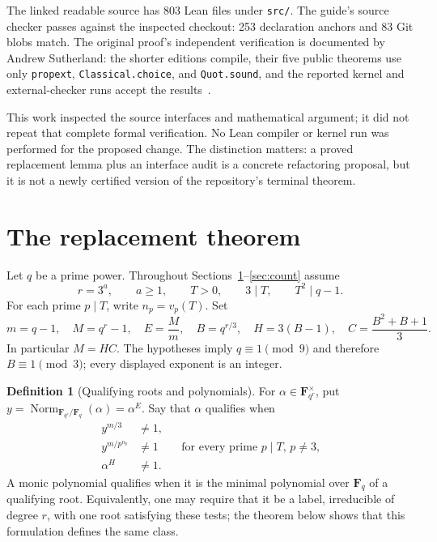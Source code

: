 \documentclass[11pt,a4paper]{article}
\newcommand{\F}{\mathbf F}
\newcommand{\Nm}{\operatorname{Norm}}
\newcommand{\src}[1]{\nolinkurl{#1}}
\theoremstyle{definition}
\newtheorem{definition}[theorem]{Definition}
\theoremstyle{remark}
\begin{document}
The linked readable source has 803 Lean files under \src{src/}. The guide's
source checker passes against the inspected checkout: 253 declaration
anchors and 83 Git blobs match. The original proof's independent
verification is documented by Andrew Sutherland: the shorter editions
compile, their five public theorems use only \src{propext},
\src{Classical.choice}, and \src{Quot.sound}, and the reported kernel and
external-checker runs accept the results~\cite{sutherland}.

This work inspected the source interfaces and mathematical argument; it
did not repeat that complete formal verification. No Lean compiler or
kernel run was performed for the proposed change. The distinction matters:
a proved replacement lemma plus an interface audit is a concrete
refactoring proposal, but it is not a newly certified version of the
repository's terminal theorem.

\section{The replacement theorem}
\label{sec:theorem}

Let $q$ be a prime power. Throughout Sections~\ref{sec:theorem}--\ref{sec:count}
assume
\begin{equation}
 r=3^a,\qquad a\ge1,\qquad T>0,\qquad 3\mid T,
 \qquad T^2\mid q-1.
 \label{eq:hyp}
\end{equation}
For each prime $p\mid T$, write $n_p=v_p(T)$. Set
\begin{equation}
 m=q-1,\quad M=q^r-1,\quad E=\frac{M}{m},\quad
 B=q^{r/3},\quad H=3(B-1),\quad C=\frac{B^2+B+1}{3}.
 \label{eq:notation}
\end{equation}
In particular $M=HC$. The hypotheses imply $q\equiv1\pmod9$ and therefore
$B\equiv1\pmod3$; every displayed exponent is an integer.

\begin{definition}[Qualifying roots and polynomials]
For $\alpha\in\F_{q^r}^{\times}$, put $y=\Nm_{\F_{q^r}/\F_q}(\alpha)=\alpha^E$.
Say that $\alpha$ qualifies when
\begin{align}
 y^{m/3}&\ne1, &&\label{eq:test3}\\
 y^{m/p^{n_p}}&\ne1 &&\text{for every prime $p\mid T$, $p\ne3$,}
 \label{eq:testp}\\
 \alpha^H&\ne1. &&\label{eq:outside}
\end{align}
A monic polynomial qualifies when it is the minimal polynomial over $\F_q$
of a qualifying root. Equivalently, one may require that it be a label,
irreducible of degree $r$, with one root satisfying these tests; the theorem
below shows that this formulation defines the same class.
\end{definition}
\end{document}
